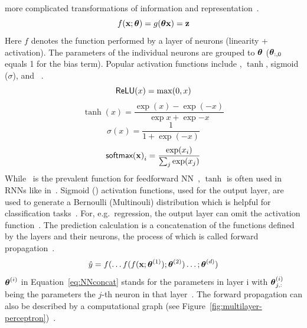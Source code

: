 more complicated transformations of information and representation~\citep{goodfellow_deep_2016}.
\begin{equation}\label{eq:neuron}
    f(\textbf{x};\boldsymbol{\theta}) = g(\boldsymbol{\theta}\textbf{x})=\textbf{z}
\end{equation}
Here $f$ denotes the function performed by a layer of neurons (linearity + activation).
The parameters of the individual neurons are grouped to $\boldsymbol{\theta}$ ($\boldsymbol{\theta}_{:,0}$ equals 1 for the
bias term).
Popular activation functions include \relu, $\tanh$, sigmoid ($\sigma$), and
\sfmx~\citep{shrestha_review_2019}.
\begin{equation}\label{eq:relu}
    \textsf{ReLU}(x)=\max(0,x)
\end{equation}
\begin{equation}\label{eq:tanh}
    \tanh(x)=\frac{\exp(x)-\exp(-x)}{\exp{x}+\exp{-x}}
\end{equation}
\begin{equation}\label{eq:sigmoid}
    \sigma(x)=\frac{1}{1+\exp(-x)}
\end{equation}
\begin{equation}\label{eq:softmax}
    {\textsf{softmax}(\textbf{x})}_i = \frac{\exp(x_i)}{\sum_j \exp(x_j)}
\end{equation}
While \relu\ is the prevalent function for feedforward \ac{NN}~\citep{goodfellow_deep_2016},
$\tanh$ is often used in \acp{RNN} like in~\cite{sherstinsky_fundamentals_2020,greff_lstm_2017}.
Sigmoid (\sfmx) activation functions, used for the output layer, are used to generate a Bernoulli
(Multinouli) distribution which is helpful for classification tasks~\citep{goodfellow_deep_2016}.
For, e.g.\ regression, the output layer can omit the activation
function~\citep{goodfellow_deep_2016}.
The prediction calculation is a concatenation of the functions defined by the
layers and their neurons, the process of which is called
forward propagation~\citep{ponti_everything_2017,goodfellow_deep_2016}.
\begin{equation}\label{eq:NNconcat}
    \hat{y}=f(\ldots f(f(\textbf{x};\boldsymbol{\theta}^{(1)});\boldsymbol{\theta}^{(2)})\ldots;\boldsymbol{\theta}^{(d)})
\end{equation}
$\boldsymbol{\theta}^{(i)}$ in Equation~\ref{eq:NNconcat} stands for the parameters in layer i with $\boldsymbol{\theta}^{(i)}_{j,:}$
being the parameters the $j$-th neuron in that layer~\citep{goodfellow_deep_2016}.
The forward propagation can also be described by a computational graph (see
Figure~\ref{fig:multilayer-perceptron})~\citep{goodfellow_deep_2016}.

